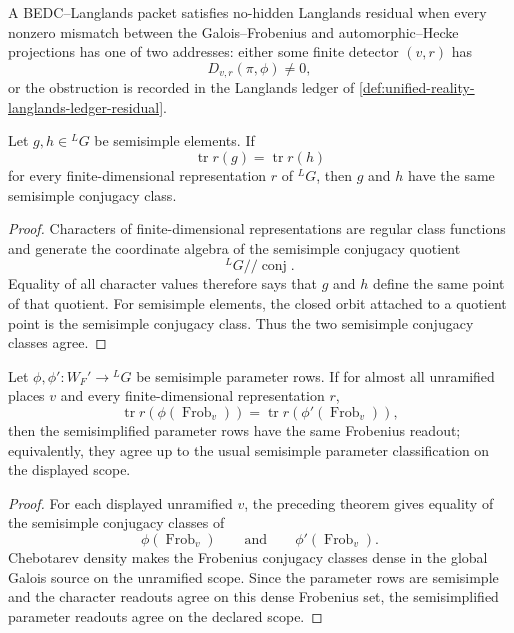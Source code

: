 \begin{definition}
\label{def:unified-reality-no-hidden-langlands-residual}
A BEDC--Langlands packet satisfies no-hidden Langlands residual when
every nonzero mismatch between the Galois--Frobenius and
automorphic--Hecke projections has one of two addresses: either some
finite detector $(v,r)$ has
$$
D_{v,r}(\pi,\phi)\ne0,
$$
or the obstruction is recorded in the Langlands ledger of
\autoref{def:unified-reality-langlands-ledger-residual}.
\end{definition}

\begin{theorem}
\label{thm:unified-reality-tannakian-detectors-separate-classes}
Let $g,h\in{}^LG$ be semisimple elements. If
$$
\operatorname{tr}r(g)=\operatorname{tr}r(h)
$$
for every finite-dimensional representation $r$ of ${}^LG$, then $g$
and $h$ have the same semisimple conjugacy class.
\end{theorem}
\begin{proof}
Characters of finite-dimensional representations are regular class
functions and generate the coordinate algebra of the semisimple
conjugacy quotient
$$
{}^LG/\!/\operatorname{conj}.
$$
Equality of all character values therefore says that $g$ and $h$ define
the same point of that quotient. For semisimple elements, the closed
orbit attached to a quotient point is the semisimple conjugacy class.
Thus the two semisimple conjugacy classes agree.
\end{proof}

\begin{theorem}
\label{thm:unified-reality-chebotarev-tannakian-uniqueness}
Let $\phi,\phi':W_F'\to{}^LG$ be semisimple parameter rows. If for almost
all unramified places $v$ and every finite-dimensional representation
$r$,
$$
\operatorname{tr}r(\phi(\operatorname{Frob}_v))
=
\operatorname{tr}r(\phi'(\operatorname{Frob}_v)),
$$
then the semisimplified parameter rows have the same Frobenius readout;
equivalently, they agree up to the usual semisimple parameter
classification on the displayed scope.
\end{theorem}
\begin{proof}
For each displayed unramified $v$, the preceding theorem gives equality
of the semisimple conjugacy classes of
$$
\phi(\operatorname{Frob}_v)
\qquad\text{and}\qquad
\phi'(\operatorname{Frob}_v).
$$
Chebotarev density makes the Frobenius conjugacy classes dense in the
global Galois source on the unramified scope. Since the parameter rows
are semisimple and the character readouts agree on this dense
Frobenius set, the semisimplified parameter readouts agree on the
declared scope.
\end{proof}

